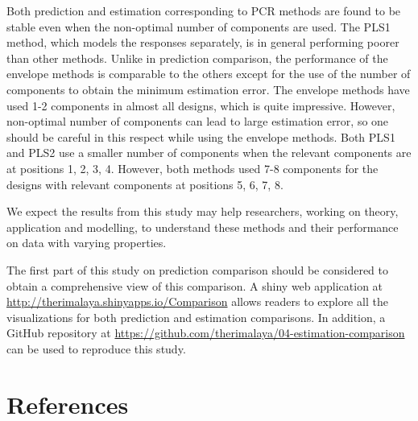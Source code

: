\documentclass[12pt,3p,authoryear]{elsarticle}
\begin{document}
Both prediction and estimation corresponding to PCR methods are found to be stable even when the non-optimal number of components are used. The PLS1 method, which models the responses separately, is in general performing poorer than other methods. Unlike in prediction comparison, the performance of the envelope methods is comparable to the others except for the use of the number of components to obtain the minimum estimation error. The envelope methods have used 1-2 components in almost all designs, which is quite impressive. However, non-optimal number of components can lead to large estimation error, so one should be careful in this respect while using the envelope methods. Both PLS1 and PLS2 use a smaller number of components when the relevant components are at positions 1, 2, 3, 4. However, both methods used 7-8 components for the designs with relevant components at positions 5, 6, 7, 8.

We expect the results from this study may help researchers, working on theory, application and modelling, to understand these methods and their performance on data with varying properties.

The first part of this study \citep{rimal2019pred} on prediction comparison should be considered to obtain a comprehensive view of this comparison. A shiny \citep{shiny} web application at \url{http://therimalaya.shinyapps.io/Comparison} allows readers to explore all the visualizations for both prediction and estimation comparisons. In addition, a GitHub repository at \url{https://github.com/therimalaya/04-estimation-comparison} can be used to reproduce this study.

\hypertarget{references}{%
\section*{References}\label{references}}

\hypertarget{refs}{}


\renewcommand\refname{References}

\end{document}

